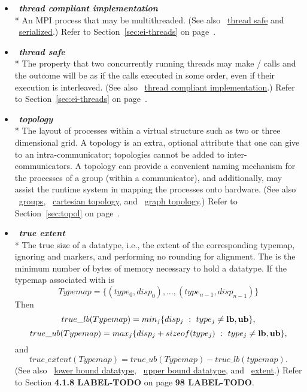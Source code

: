\begin{itemize}
\label{glossary:thread_compliant_implementation}
\item  ~\hypertarget{glossary:thread_compliant_implementation}{\emph{\textbf{thread compliant implementation}}} \\*
An MPI process that may be multithreaded.
(See also ~\hyperlink{glossary:thread_safe}{thread safe} and ~\hyperlink{glossary:serialized}{serialized}.)
Refer to Section~\ref{sec:ei-threads} on page~\pageref{sec:ei-threads}.

\label{glossary:thread_safe}
\item  ~\hypertarget{glossary:thread_safe}{\emph{\textbf{thread safe}}} \\*
The property that two concurrently
running threads may make \MPI/ calls and the outcome will be as if the
calls executed in some order, even if their execution is interleaved.
(See also ~\hyperlink{glossary:thread_compliant_implementation}{thread compliant implementation}.)
Refer to Section~\ref{sec:ei-threads} on page~\pageref{sec:ei-threads}.

\label{glossary:topology}
\item  ~\hypertarget{glossary:topology}{\emph{\textbf{topology}}} \\*
The layout of processes within a virtual structure such as two or three
dimensional grid.
A topology is an extra,
optional attribute that one can give to an intra-communicator; topologies
cannot be added to inter-communicators.  A topology can provide a convenient
naming mechanism for the processes of a group (within a communicator), and
additionally, may assist the runtime system in mapping the processes onto
hardware.
(See also ~\hyperlink{glossary:groups}{groups},
~\hyperlink{glossary:cartesian_topology}{cartesian topology}, 
and ~\hyperlink{glossary:graph_topology}{graph topology}.)
Refer to Section~\ref{sec:topol} on page~\pageref{sec:topol}.

\label{glossary:true_extent}
\item  ~\hypertarget{glossary:true_extent}{\emph{\textbf{true extent}}} \\*
The true size of a datatype, i.e., the extent of the corresponding typemap, ignoring
 and  markers, and performing no
rounding for alignment.  The  is the minimum number of bytes of
memory necessary to hold a datatype. 
If the typemap associated with
 is
\[
Typemap = \{ (type_0, disp_0), \ldots , (type_{n-1}, disp_{n-1})\}
\]
Then
\[
true\_lb(Typemap) = min_j  \{ disp_j ~:~ type_j \ne {\bf lb, ub} \},
\]
\[
true\_ub (Typemap) = max_j \{disp_j + sizeof(type_j) ~:~ type_j \ne
{\bf lb, ub}\} ,
\]
and
\[
true\_extent (Typemap) = true\_ub(Typemap) - true\_lb(typemap).
\]
(See also ~\hyperlink{glossary:lower_bound_datatype}{lower bound datatype}, ~\hyperlink{glossary:upper_bound_datatype}{upper bound datatype}, and ~\hyperlink{glossary:extent}{extent}.)
Refer to Section {\bf 4.1.8 LABEL-TODO} on page {\bf 98 LABEL-TODO}.


\end{itemize}
